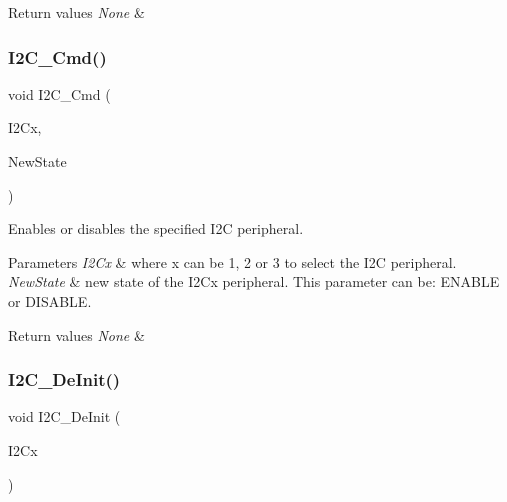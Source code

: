 \begin{DoxyRetVals}{Return values}
{\em None} & \\
\hline
\end{DoxyRetVals}
\mbox{\label{group___i2_c___group1_ga7e1323c9133c2cb424dfb5b10b7d2f0b}} 
\subsubsection{\texorpdfstring{I2\+C\+\_\+\+Cmd()}{I2C\_Cmd()}}
{\footnotesize\ttfamily void I2\+C\+\_\+\+Cmd (\begin{DoxyParamCaption}\item[{I2\+C\+\_\+\+Type\+Def $\ast$}]{I2\+Cx,  }\item[{Functional\+State}]{New\+State }\end{DoxyParamCaption})}



Enables or disables the specified I2C peripheral. 


\begin{DoxyParams}{Parameters}
{\em I2\+Cx} & where x can be 1, 2 or 3 to select the I2C peripheral. \\
\hline
{\em New\+State} & new state of the I2\+Cx peripheral. This parameter can be\+: E\+N\+A\+B\+LE or D\+I\+S\+A\+B\+LE. \\
\hline
\end{DoxyParams}

\begin{DoxyRetVals}{Return values}
{\em None} & \\
\hline
\end{DoxyRetVals}
\mbox{\label{group___i2_c___group1_ga2ee214364603059ad5d9089f749f5bfd}} 
\subsubsection{\texorpdfstring{I2\+C\+\_\+\+De\+Init()}{I2C\_DeInit()}}
{\footnotesize\ttfamily void I2\+C\+\_\+\+De\+Init (\begin{DoxyParamCaption}\item[{I2\+C\+\_\+\+Type\+Def $\ast$}]{I2\+Cx }\end{DoxyParamCaption})}



